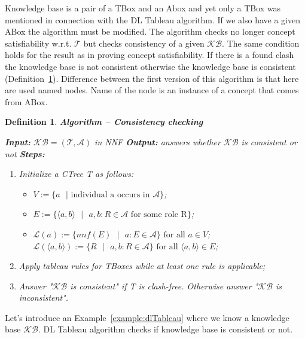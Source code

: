 \documentclass[12pt,a4paper]{article}
\newtheorem{definition}{Definition}[subsection]
\begin{document}
Knowledge base is a pair of a TBox and an Abox and yet only a TBox was mentioned in connection with the DL Tableau algorithm. If we also have a given ABox the algorithm must be modified. The algorithm checks no longer concept satisfiability w.r.t. $\mathcal{T}$ but checks consistency of a given $\mathcal{KB}$. The same condition holds for the result as in proving concept satisfiability. If there is a found clash the knowledge base is not consistent otherwise the knowledge base is consistent (Definition~\ref{def:consistency}). Difference between the first version of this algorithm is that here are used named nodes. Name of the node is an instance of a concept that comes from ABox. 

\begin{definition}{\textbf{Algorithm -- Consistency checking}}
	\label{def:consistency}

\textbf{Input:} $\mathcal{KB} = (\mathcal{T}, \mathcal{A})$ in NNF \newline
\indent \textbf{Output:} answers whether $\mathcal{KB}$ is consistent or not \newline
\indent \textbf{Steps:}
\begin{enumerate}
	\item Initialize a CTree T as follows:
		\begin{itemize}
			\item $V := \{ a \text{ } | \text{ individual a occurs in } \mathcal{A} \}$;
			\item $E := \{ \langle a,b \rangle \text{ } | \text{ } a,b : R \in \mathcal{A} \text{ for some role R} \}$;
			\item $\mathcal{L}(a) := \{ nnf(E) \text{ } | \text{ } a:E \in \mathcal{A}\} \text{ for all } a \in V$; \newline
			$\mathcal{L}(\langle a,b \rangle) := \{ R \text{ } | \text{ } a,b:R \in \mathcal{A}\} \text{ for all } \langle a,b \rangle \in E$;
		\end{itemize}
	\item Apply tableau rules for TBoxes while at least one rule is applicable;
	\item Answer "$\mathcal{KB}$ is consistent" if T is clash-free. Otherwise answer "$\mathcal{KB}$ is inconsistent".
\end{enumerate}

\end{definition}

Let's introduce an Example~\ref{example:dlTableau} where we know a knowledge base $\mathcal{KB}$. DL Tableau algorithm checks if knowledge base is consistent or not.
\end{document}
